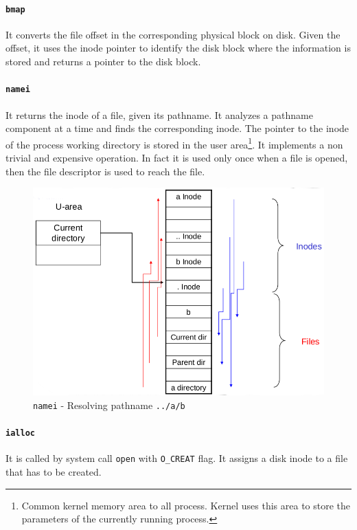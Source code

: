 \paragraph{\texttt{bmap}} It converts the file offset in the corresponding physical block on disk. Given the offset, it uses the inode pointer to identify the disk block where the information is stored and returns a pointer to the disk block.

\paragraph{\texttt{namei}} It returns the inode of a file, given its pathname. It analyzes a pathname component at a time and finds the corresponding inode. The pointer to the inode of the process working directory is stored in the user area\footnote{Common kernel memory area to all process. Kernel uses this area to store the parameters of the currently running process.}. It implements a non trivial and expensive operation. In fact it is used only once when a file is opened, then the file descriptor is used to reach the file.

\begin{figure}[hbtp]
\centering
\includegraphics[scale=0.35]{images/file_system/namei.png}
\caption{\texttt{namei} - Resolving pathname \texttt{../a/b}}
\end{figure}

\paragraph{\texttt{ialloc}} It is called by system call \texttt{open} with \texttt{O\_CREAT} flag. It assigns a disk inode to a file that has to be created.

